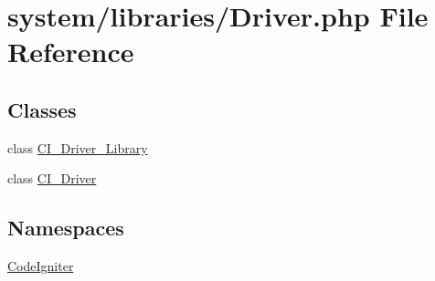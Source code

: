 \hypertarget{_driver_8php}{}\section{system/libraries/\+Driver.php File Reference}
\label{_driver_8php}
\subsection*{Classes}
\begin{DoxyCompactItemize}
\item 
class \mbox{\hyperlink{class_c_i___driver___library}{C\+I\+\_\+\+Driver\+\_\+\+Library}}
\item 
class \mbox{\hyperlink{class_c_i___driver}{C\+I\+\_\+\+Driver}}
\end{DoxyCompactItemize}
\subsection*{Namespaces}
\begin{DoxyCompactItemize}
\item 
 \mbox{\hyperlink{namespace_code_igniter}{Code\+Igniter}}
\end{DoxyCompactItemize}
